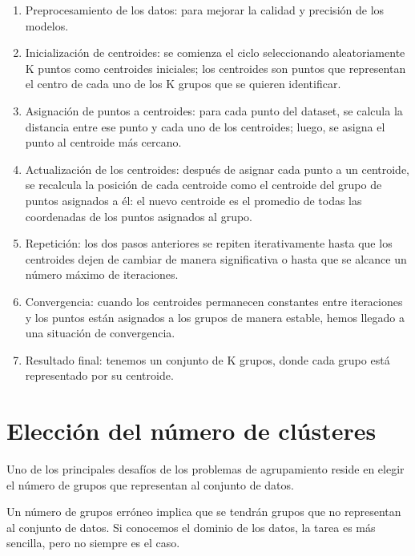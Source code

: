 \begin{enumerate}
    \item Preprocesamiento de los datos: para mejorar la calidad y precisión de los modelos.

    \item Inicialización de centroides: se comienza el ciclo seleccionando aleatoriamente K puntos como centroides iniciales; los centroides son puntos que representan el centro de cada uno de los K grupos que se quieren identificar.

    \item Asignación de puntos a centroides: para cada punto del dataset, se calcula la distancia entre ese punto y cada uno de los centroides; luego, se asigna el punto al centroide más cercano.

    \item Actualización de los centroides: después de asignar cada punto a un centroide, se recalcula la posición de cada centroide como el centroide del grupo de puntos asignados a él: el nuevo centroide es el promedio de todas las coordenadas de los puntos asignados al grupo.

    \item Repetición: los dos pasos anteriores se repiten iterativamente hasta que los centroides dejen de cambiar de manera significativa o hasta que se alcance un número máximo de iteraciones.

    \item Convergencia: cuando los centroides permanecen constantes entre iteraciones y los puntos están asignados a los grupos de manera estable, hemos llegado a una situación de convergencia.

    \item Resultado final: tenemos un conjunto de K grupos, donde cada grupo está representado por su centroide.
\end{enumerate}


\section{Elección del número de clústeres}
Uno de los principales desafíos de los problemas de agrupamiento reside en elegir el número de grupos que representan al conjunto de datos. 

Un número de grupos erróneo implica que se tendrán grupos que no representan al conjunto de datos. Si conocemos el dominio de los datos, la tarea es más sencilla, pero no siempre es el caso.

